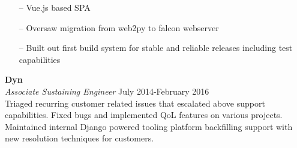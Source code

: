 \begin{minipage}[t]{\linewidth}
    \begin{itemize}
        \item[--] Vue.js based SPA
        \item[--] Oversaw migration from web2py to falcon webserver
        \item[--] Built out first build system for stable and reliable releases including test capabilities
    \end{itemize}
    \end{minipage}

\large{\textbf{Dyn}} \\
\textit{Associate Sustaining Engineer} \hfill July 2014-February 2016 \\[3.75pt]
Triaged recurring customer related issues that escalated above support capabilities. Fixed bugs and implemented QoL features on various projects. Maintained internal Django powered tooling platform backfilling support with new resolution techniques for customers.
